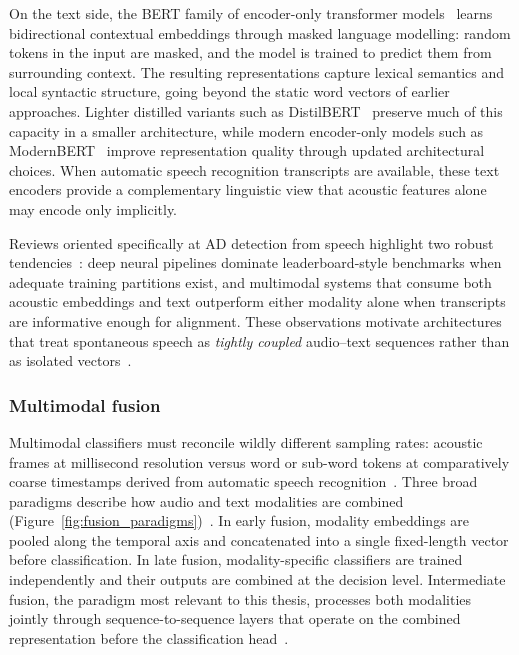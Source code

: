 On the text side, the BERT family of encoder-only transformer models~\cite{devlin2019bert} learns bidirectional contextual embeddings through masked language modelling: random tokens in the input are masked, and the model is trained to predict them from surrounding context.
The resulting representations capture lexical semantics and local syntactic structure, going beyond the static word vectors of earlier approaches.
Lighter distilled variants such as DistilBERT~\cite{sanh2019distilbert} preserve much of this capacity in a smaller architecture, while modern encoder-only models such as ModernBERT~\cite{warner2025modernbert} improve representation quality through updated architectural choices.
When automatic speech recognition transcripts are available, these text encoders provide a complementary linguistic view that acoustic features alone may encode only implicitly.

Reviews oriented specifically at AD detection from speech highlight two robust tendencies~\cite{ding2024speechsurvey}: deep neural pipelines dominate leaderboard-style benchmarks when adequate training partitions exist, and multimodal systems that consume both acoustic embeddings and text outperform either modality alone when transcripts are informative enough for alignment.
These observations motivate architectures that treat spontaneous speech as \emph{tightly coupled} audio--text sequences rather than as isolated vectors~\cite{macoir2025rethinkingppa}.

\subsubsection{Multimodal fusion}

Multimodal classifiers must reconcile wildly different sampling rates: acoustic frames at millisecond resolution versus word or sub-word tokens at comparatively coarse timestamps derived from automatic speech recognition~\cite{ding2024speechsurvey}.
Three broad paradigms describe how audio and text modalities are combined (Figure~\ref{fig:fusion_paradigms})~\cite{ding2024speechsurvey}.
In early fusion, modality embeddings are pooled along the temporal axis and concatenated into a single fixed-length vector before classification.
In late fusion, modality-specific classifiers are trained independently and their outputs are combined at the decision level.
Intermediate fusion, the paradigm most relevant to this thesis, processes both modalities jointly through sequence-to-sequence layers that operate on the combined representation before the classification head~\cite{esteve2025speechadppa}.

